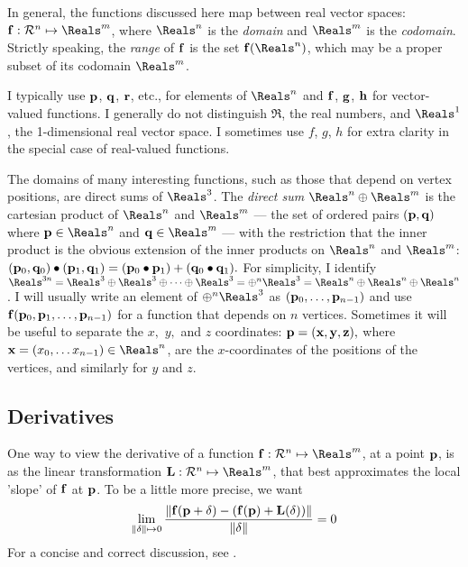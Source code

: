 In general, the functions discussed here map between real vector spaces:
$\f:{\Re}^{n} \mapsto \Reals^{m}$, where $\Reals^n$ is the
{\it domain} and $\Reals^m$ is the {\it codomain}.
Strictly speaking, the {\it range} of ${\mathbf f}$ is the set $\f(\Reals^n)$,
which may be a proper subset of its codomain $\Reals^m$.

I typically use ${\mathbf p}$, ${\mathbf q}$, ${\mathbf r}$, etc., for elements of $\Reals^n$
and
${\mathbf f}$, ${\mathbf g}$, ${\mathbf h}$ for vector-valued functions.
I generally do not distinguish $\Re$, the real numbers,
and $\Reals^1$, the 1-dimensional real vector space.
I sometimes use $f$, $g$, $h$ for extra clarity in the special
case of real-valued functions.

The domains of many interesting functions,
such as those that depend on vertex positions,
are direct sums of $\Reals^3$.
The {\it direct sum} $\Reals^n \oplus \Reals^m$ is the cartesian product
of $\Reals^n$ and $\Reals^m$ --- the set of ordered pairs $({\mathbf p},{\mathbf q})$
where $\p \in \Reals^n$ and $\q \in \Reals^m$ ---
with the restriction that the inner product is the obvious extension of the
inner products on $\Reals^n$ and $\Reals^m$:
$({\mathbf p}_0,{\mathbf q}_0) \bullet ({\mathbf p}_1,{\mathbf q}_1) = ({\mathbf p}_0 \bullet {\mathbf p}_1) + ({\mathbf q}_0 \bullet {\mathbf q}_1).$
For simplicity, I identify
$\Reals^{3n} = \Reals^3 \oplus \Reals^3 \oplus \cdots \oplus \Reals^3 = \oplus^n \Reals^3
= \Reals^n \oplus \Reals^n \oplus \Reals^n $.
I will usually write an element of $\oplus^n \Reals^3$ as
$({\mathbf p}_0,\ldots,{\mathbf p}_{n-1})$
and use
${\mathbf f}({\mathbf p}_0,{\mathbf p}_1,\ldots,{\mathbf p}_{n-1})$
for a function that depends on $n$ vertices.
Sometimes it will be useful to separate the $x,$ $y,$ and $z$ coordinates:
${\mathbf p} = ({\mathbf x},{\mathbf y},{\mathbf z}),$
where $\x =(x_0, \ldots x_{n-1}) \in \Reals^n$, are the $x$-coordinates
of the positions of the vertices, and similarly for $y$ and $z$.


\subsection{Derivatives}
\label{sec:derivatives}

One way to view the derivative of a function
$\f:{\Re}^{n} \mapsto \Reals^{m}$,
at a point ${\mathbf p}$,
is as the linear transformation $\L:{\Re}^{n} \mapsto \Reals^{m}$,
that best approximates the local 'slope' of ${\mathbf f}$ at ${\mathbf p}$.
To be a little more precise, we want
\begin{displaymath}
\lim_{ \|{\bf \delta}  \| \mapsto 0}
{ \|{{\mathbf f}({\mathbf p} + {\bf \delta}) - ({\mathbf f}({\mathbf p}) + {\mathbf L}({\bf\delta})) \|}
  \over  \|{\bf \delta}  \|}
 = 0
\end{displaymath}
For a concise and correct discussion, see \cite{spivak-1965}.

